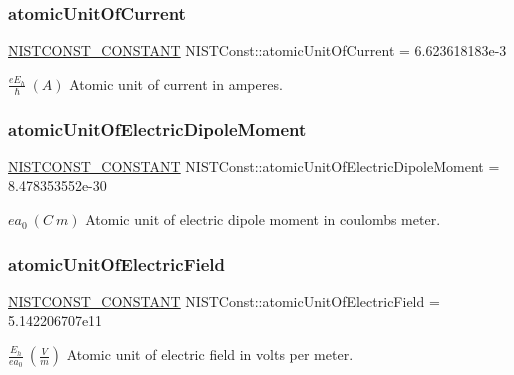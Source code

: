 \subsubsection{\texorpdfstring{atomic\+Unit\+Of\+Current}{atomicUnitOfCurrent}}
{\footnotesize\ttfamily \mbox{\hyperlink{_n_i_s_t_const_8hpp_a2b0fc1d7452373f816175dd86ce26729}{N\+I\+S\+T\+C\+O\+N\+S\+T\+\_\+\+C\+O\+N\+S\+T\+A\+NT}} N\+I\+S\+T\+Const\+::atomic\+Unit\+Of\+Current = 6.\+623618183e-\/3}

$\frac{e E_h}{\hbar} \ (A)$ Atomic unit of current in amperes. \mbox{\label{group___n_i_s_t_const-_atomic_unit_ga9d0aa0f462c3cbf3000181f1f4dc2e97}} 
\subsubsection{\texorpdfstring{atomic\+Unit\+Of\+Electric\+Dipole\+Moment}{atomicUnitOfElectricDipoleMoment}}
{\footnotesize\ttfamily \mbox{\hyperlink{_n_i_s_t_const_8hpp_a2b0fc1d7452373f816175dd86ce26729}{N\+I\+S\+T\+C\+O\+N\+S\+T\+\_\+\+C\+O\+N\+S\+T\+A\+NT}} N\+I\+S\+T\+Const\+::atomic\+Unit\+Of\+Electric\+Dipole\+Moment = 8.\+478353552e-\/30}

$e a_0 \ (C\ m)$ Atomic unit of electric dipole moment in coulombs meter. \mbox{\label{group___n_i_s_t_const-_atomic_unit_ga5d6c6686a6a6ea451d3cb975878f623a}} 
\subsubsection{\texorpdfstring{atomic\+Unit\+Of\+Electric\+Field}{atomicUnitOfElectricField}}
{\footnotesize\ttfamily \mbox{\hyperlink{_n_i_s_t_const_8hpp_a2b0fc1d7452373f816175dd86ce26729}{N\+I\+S\+T\+C\+O\+N\+S\+T\+\_\+\+C\+O\+N\+S\+T\+A\+NT}} N\+I\+S\+T\+Const\+::atomic\+Unit\+Of\+Electric\+Field = 5.\+142206707e11}

$\frac{E_h}{e a_0} \ (\frac{V}{m})$ Atomic unit of electric field in volts per meter. \mbox{\label{group___n_i_s_t_const-_atomic_unit_ga02c36e91d6f95d818656270669d20926}} 
